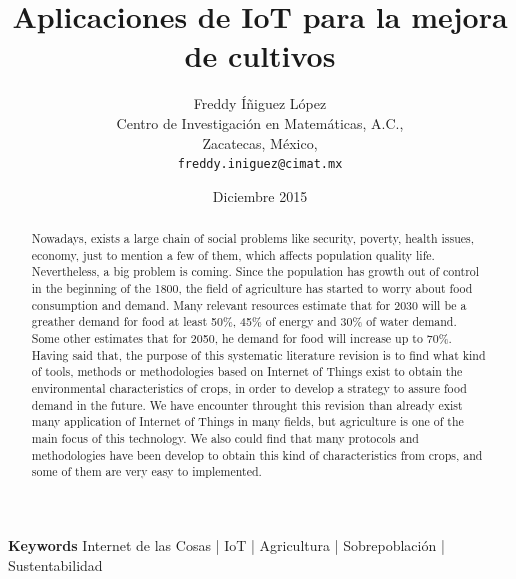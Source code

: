 \documentclass[10pt, twocolumn]{article}
\begin{document}
\title{\textbf{Aplicaciones de IoT para la mejora de cultivos}}
\author{Freddy Íñiguez López\\
	Centro de Investigación en Matemáticas, A.C.,\\
	Zacatecas, México,\\
	\texttt{freddy.iniguez@cimat.mx}}
\date{Diciembre 2015}
\maketitle

\begin{abstract}
Nowadays, exists a large chain of social problems like security, poverty, health issues, economy, just to mention a few of them, which affects population quality life. Nevertheless, a big problem is coming. Since the population has growth out of control in the beginning of the 1800, the field of agriculture has started to worry about food consumption and demand. Many relevant resources estimate that for 2030 will be a greather demand for food at least 50\%, 45\% of energy and 30\% of water demand. Some other estimates that for 2050, he demand for food will increase up to 70\%. \\ Having said that, the purpose of this systematic literature revision is to find what kind of tools, methods or methodologies based on Internet of Things exist to obtain the environmental characteristics of crops, in order to develop a strategy to assure food demand in the future. We have encounter throught this revision than already exist many application of Internet of Things in many fields, but agriculture is one of the main focus of this technology. We also could find that many protocols and methodologies have been develop to obtain this kind of characteristics from crops, and some of them are very easy to implemented.
\end{abstract}
\paragraph{}
\textbf{Keywords} Internet de las Cosas | IoT | Agricultura | Sobrepoblación | Sustentabilidad
\end{document}
